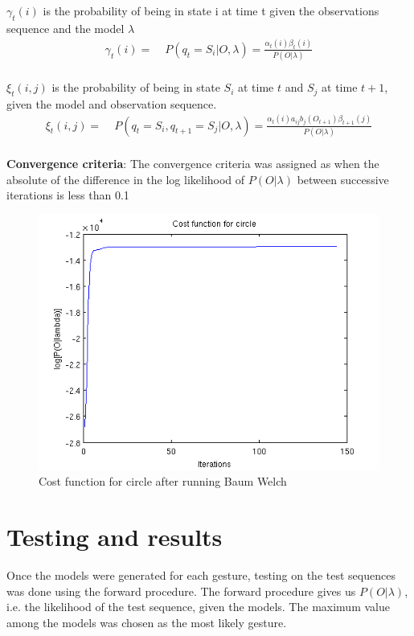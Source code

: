 \documentclass[english]{article}
\begin{document}
$\gamma_t(i)$ is the probability of being in state i at time t given the observations sequence and the model $\lambda$
\begin{align*}
	\gamma_t(i) =&\; P(q_t = S_i | O, \lambda) = \frac{\alpha_t(i) \beta_t(i)}{P(O | \lambda)} \\ 
\end{align*}

$\xi_t(i,j)$ is the probability of being in state $S_i$ at time $t$ and $S_j$ at time $t+1$, given the model and observation sequence. 
\begin{align*}
	\xi_t(i,j) =&\; P(q_t = S_i, q_{t+1} = S_j | O,\lambda) = \frac{\alpha_t(i) a_{ij} b_j(O_{t+1}) \beta_{t+1}(j)}{P(O|\lambda)} \\
\end{align*}

\textbf{Convergence criteria}: The convergence criteria was assigned as when the absolute of the difference in the log likelihood of $P(O|\lambda)$ between successive iterations is less than 0.1 \\

\begin{figure}[h]
\centering
\includegraphics[scale=0.6]{cost}
\caption{Cost function for circle after running Baum Welch}
\end{figure}


\section{Testing and results}
Once the models were generated for each gesture, testing on the test sequences was done using the forward procedure. The forward procedure gives us $P(O|\lambda)$, i.e. the likelihood of the test sequence, given the models. The maximum value among the models was chosen as the most likely gesture. \\
\end{document}
